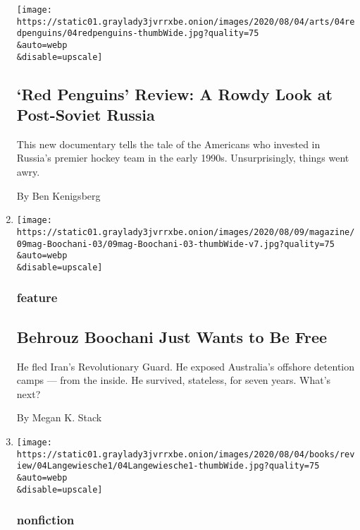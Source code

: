 \begin{enumerate}
  \texttt{[image: https://static01.graylady3jvrrxbe.onion/images/2020/08/04/arts/04redpenguins/04redpenguins-thumbWide.jpg?quality=75\\\&auto=webp\\\&disable=upscale]}

  \hypertarget{red-penguins-review-a-rowdy-look-at-post-soviet-russia}{%
  \subsection{`Red Penguins' Review: A Rowdy Look at Post-Soviet
  Russia}\label{red-penguins-review-a-rowdy-look-at-post-soviet-russia}}

  This new documentary tells the tale of the Americans who invested in
  Russia's premier hockey team in the early 1990s. Unsurprisingly,
  things went awry.

  By Ben Kenigsberg
\item
  \href{/2020/08/04/magazine/behrouz-boochani-australia.html}{}

  \texttt{[image: https://static01.graylady3jvrrxbe.onion/images/2020/08/09/magazine/09mag-Boochani-03/09mag-Boochani-03-thumbWide-v7.jpg?quality=75\\\&auto=webp\\\&disable=upscale]}

  \hypertarget{feature}{%
  \subsubsection{feature}\label{feature}}

  \hypertarget{behrouz-boochani-just-wants-to-be-free}{%
  \subsection{Behrouz Boochani Just Wants to Be
  Free}\label{behrouz-boochani-just-wants-to-be-free}}

  He fled Iran's Revolutionary Guard. He exposed Australia's offshore
  detention camps --- from the inside. He survived, stateless, for seven
  years. What's next?

  By Megan K. Stack
\item
  \href{/2020/08/04/books/review/fallout-hiroshima-hersey-lesley-m-m-blume.html}{}

  \texttt{[image: https://static01.graylady3jvrrxbe.onion/images/2020/08/04/books/review/04Langewiesche1/04Langewiesche1-thumbWide.jpg?quality=75\\\&auto=webp\\\&disable=upscale]}

  \hypertarget{nonfiction-1}{%
  \subsubsection{nonfiction}\label{nonfiction-1}}


\end{enumerate}
